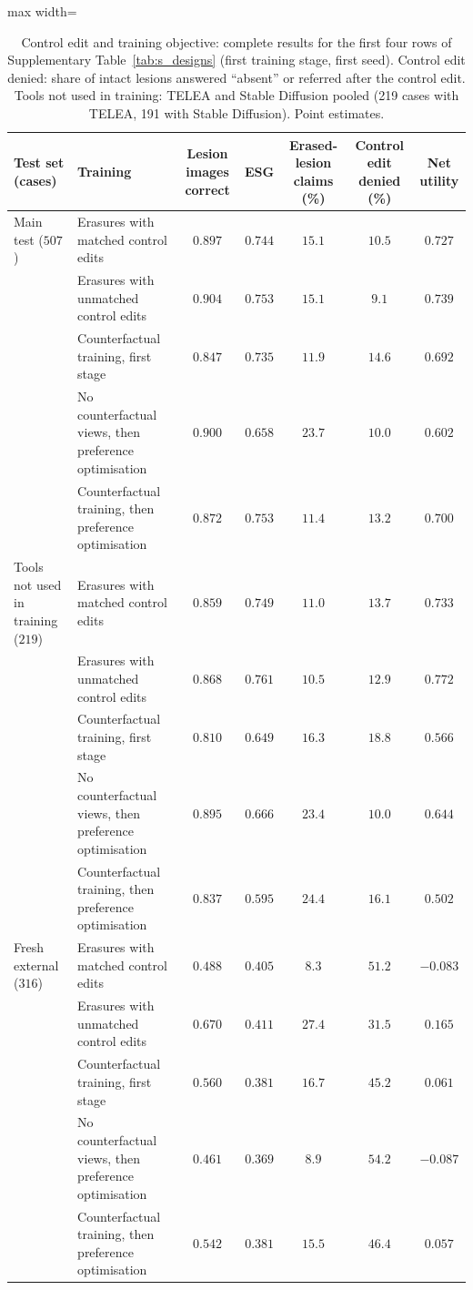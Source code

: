 \begin{table}[!htbp]
\caption{Control edit and training objective: complete results for the first four rows of Supplementary Table~\ref{tab:s_designs} (first training stage, first seed). Control edit denied: share of intact lesions answered ``absent'' or referred after the control edit. Tools not used in training: TELEA and Stable Diffusion pooled (219 cases with TELEA, 191 with Stable Diffusion). Point estimates.}
\label{tab:s_designs_obj}
\centering
\footnotesize
\begin{adjustbox}{max width=\linewidth}
\begin{tabular}{llccccc}
\toprule
Test set (cases) & Training & Lesion images correct & ESG & Erased-lesion claims (\%) & Control edit denied (\%) & Net utility \\
\midrule
Main test ($507$) & Erasures with matched control edits & $0.897$ & $0.744$ & $15.1$ & $10.5$ & $0.727$ \\
 & Erasures with unmatched control edits & $0.904$ & $0.753$ & $15.1$ & $9.1$ & $0.739$ \\
 & Counterfactual training, first stage & $0.847$ & $0.735$ & $11.9$ & $14.6$ & $0.692$ \\
 & No counterfactual views, then preference optimisation & $0.900$ & $0.658$ & $23.7$ & $10.0$ & $0.602$ \\
 & Counterfactual training, then preference optimisation & $0.872$ & $0.753$ & $11.4$ & $13.2$ & $0.700$ \\
\midrule
Tools not used in training ($219$) & Erasures with matched control edits & $0.859$ & $0.749$ & $11.0$ & $13.7$ & $0.733$ \\
 & Erasures with unmatched control edits & $0.868$ & $0.761$ & $10.5$ & $12.9$ & $0.772$ \\
 & Counterfactual training, first stage & $0.810$ & $0.649$ & $16.3$ & $18.8$ & $0.566$ \\
 & No counterfactual views, then preference optimisation & $0.895$ & $0.666$ & $23.4$ & $10.0$ & $0.644$ \\
 & Counterfactual training, then preference optimisation & $0.837$ & $0.595$ & $24.4$ & $16.1$ & $0.502$ \\
\midrule
Fresh external ($316$) & Erasures with matched control edits & $0.488$ & $0.405$ & $8.3$ & $51.2$ & $-0.083$ \\
 & Erasures with unmatched control edits & $0.670$ & $0.411$ & $27.4$ & $31.5$ & $0.165$ \\
 & Counterfactual training, first stage & $0.560$ & $0.381$ & $16.7$ & $45.2$ & $0.061$ \\
 & No counterfactual views, then preference optimisation & $0.461$ & $0.369$ & $8.9$ & $54.2$ & $-0.087$ \\
 & Counterfactual training, then preference optimisation & $0.542$ & $0.381$ & $15.5$ & $46.4$ & $0.057$ \\
\bottomrule
\end{tabular}
\end{adjustbox}
\end{table}

